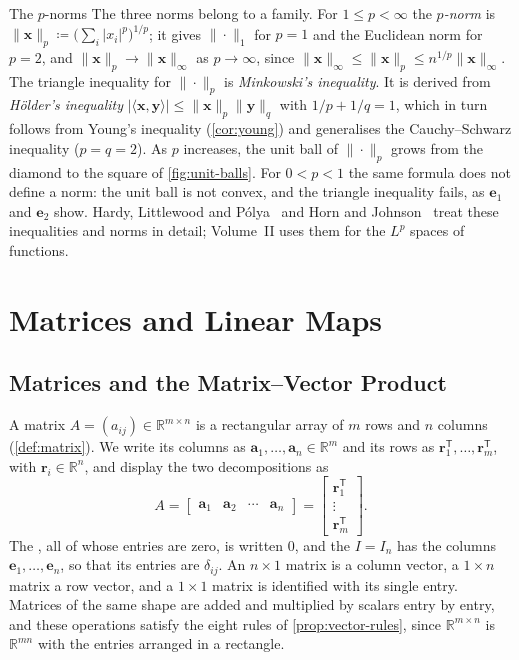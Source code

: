 \begin{note}{The \texorpdfstring{$p$}{p}-norms}
The three norms belong to a family. For $1\le p<\infty$ the \emph{$p$-norm} is $\|\mathbf x\|_p\coloneqq\bigl(\sum_i|x_i|^p\bigr)^{1/p}$; it gives $\|\cdot\|_1$ for $p=1$ and the Euclidean norm for $p=2$, and $\|\mathbf x\|_p\to\|\mathbf x\|_\infty$ as $p\to\infty$, since $\|\mathbf x\|_\infty\le\|\mathbf x\|_p\le n^{1/p}\|\mathbf x\|_\infty$. The triangle inequality for $\|\cdot\|_p$ is \emph{Minkowski's inequality}. It is derived from \emph{H\"older's inequality} $|\langle\mathbf x,\mathbf y\rangle|\le\|\mathbf x\|_p\|\mathbf y\|_q$ with $1/p+1/q=1$, which in turn follows from Young's inequality (\cref{cor:young}) and generalises the Cauchy--Schwarz inequality ($p=q=2$). As $p$ increases, the unit ball of $\|\cdot\|_p$ grows from the diamond to the square of \cref{fig:unit-balls}. For $0<p<1$ the same formula does not define a norm: the unit ball is not convex, and the triangle inequality fails, as $\mathbf e_1$ and $\mathbf e_2$ show. Hardy, Littlewood and P\'olya~\cite{hardy1952inequalities} and Horn and Johnson~\cite[Chap.~5]{horn2013} treat these inequalities and norms in detail; Volume~II uses them for the $L^p$ spaces of functions.
\end{note}

\section{Matrices and Linear Maps}
\label{sec:matrices-linear-maps}

\subsection{Matrices and the Matrix--Vector Product}

A matrix $A=(a_{ij})\in\mathbb R^{m\times n}$ is a rectangular array of $m$ rows and $n$ columns (\cref{def:matrix}). We write its columns as $\mathbf a_1,\ldots,\mathbf a_n\in\mathbb R^m$ and its rows as $\mathbf r_1^{\mathsf T},\ldots,\mathbf r_m^{\mathsf T}$, with $\mathbf r_i\in\mathbb R^n$, and display the two decompositions as
\[
A=\begin{bmatrix}\mathbf a_1&\mathbf a_2&\cdots&\mathbf a_n\end{bmatrix}=\begin{bmatrix}\mathbf r_1^{\mathsf T}\\\vdots\\\mathbf r_m^{\mathsf T}\end{bmatrix}.
\]
The , all of whose entries are zero, is written $0$, and the  $I=I_n$ has the columns $\mathbf e_1,\ldots,\mathbf e_n$, so that its entries are $\delta_{ij}$. An $n\times1$ matrix is a column vector, a $1\times n$ matrix a row vector, and a $1\times1$ matrix is identified with its single entry. Matrices of the same shape are added and multiplied by scalars entry by entry, and these operations satisfy the eight rules of \cref{prop:vector-rules}, since $\mathbb R^{m\times n}$ is $\mathbb R^{mn}$ with the entries arranged in a rectangle.

